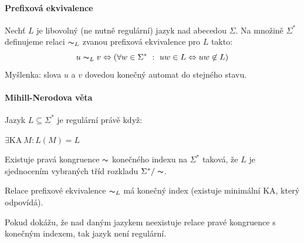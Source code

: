 \paragraph*{Prefixová ekvivalence} Nechť $L$ je libovolný (ne nutně regulární) jazyk nad abecedou $\Sigma$. Na množině $\Sigma^*$ definujeme relaci $\thicksim_L$ zvanou prefixová ekvivalence pro $L$ takto: $$ u \thicksim_L v \Leftrightarrow ( \forall w \in \Sigma^* ~:~ uw \in L \Leftrightarrow uw \not\in L )$$
Myšlenka: slova $u$ a $v$ dovedou konečný automat do stejného stavu.

\paragraph*{Mihill-Nerodova věta} Jazyk $L \subseteq \Sigma^*$ je regulární právě když: \begin{compactitem}
    \item $\exists \text{KA} ~ M : L(M) = L$
    \item Existuje pravá kongruence $\thicksim$ konečného indexu na $\Sigma^*$ taková, že $L$ je sjednocením vybraných tříd rozkladu $\Sigma^* / \thicksim$.
    \item Relace prefixové ekvivalence $\thicksim_L$ má konečný index (existuje minimální KA, který odpovídá).
\end{compactitem}

Pokud dokážu, že nad daným jazykem neexistuje relace pravé kongruence s konečným indexem, tak jazyk není regulární.
